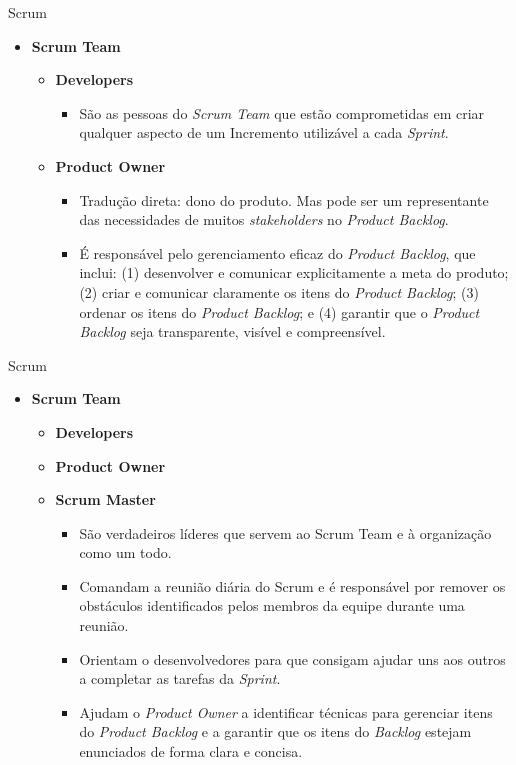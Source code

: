 \documentclass{beamer}
\begin{document}
\begin{frame}{Scrum}
	\begin{itemize}
		\item \textbf{Scrum Team}
			\begin{itemize}
				\item \textbf{Developers}
				\begin{itemize}
					\justifying
					\item<1> São as pessoas do \textit{Scrum Team} que estão comprometidas em criar qualquer aspecto de um Incremento utilizável a cada \textit{Sprint}.
				\end{itemize}
				\item<2> \textbf{Product Owner}
				\begin{itemize}
					\justifying
					\item<2> Tradução direta: dono do produto. Mas pode ser um representante das necessidades de muitos \textit{stakeholders} no \textit{Product Backlog}.
					\item<2> É responsável pelo gerenciamento eficaz do \textit{Product Backlog}, que inclui: (1) desenvolver e comunicar explicitamente a meta do produto; (2) criar e comunicar claramente os itens do \textit{Product Backlog}; (3) ordenar os itens do \textit{Product Backlog}; e (4) garantir que o \textit{Product Backlog} seja transparente, visível e compreensível.
				\end{itemize}
			\end{itemize}
	\end{itemize}
\end{frame}

\begin{frame}{Scrum}
	\begin{itemize}
		\item \textbf{Scrum Team}
		\begin{itemize}
			\item \textbf{Developers}
			\item \textbf{Product Owner}
			\item \textbf{Scrum Master}
			\begin{itemize}
				\justifying
				\item São verdadeiros líderes que servem ao Scrum Team e à organização como um todo.
				\item Comandam a reunião diária do Scrum e é responsável por remover os obstáculos identificados pelos membros da equipe durante uma reunião.
				\item Orientam o desenvolvedores para que consigam ajudar uns aos outros a completar as tarefas da \textit{Sprint}.
				\item Ajudam o \textit{Product Owner} a identificar técnicas para gerenciar itens do \textit{Product Backlog} e a garantir que os itens do \textit{Backlog} estejam enunciados de forma clara e concisa.
			\end{itemize}
		\end{itemize}
	\end{itemize}
\end{frame}
\end{document}

